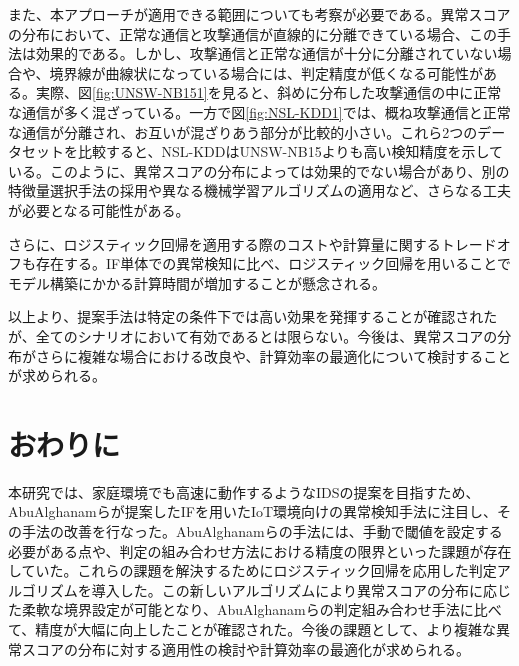 \documentclass{css}
\begin{document}
また、本アプローチが適用できる範囲についても考察が必要である。異常スコアの分布において、正常な通信と攻撃通信が直線的に分離できている場合、この手法は効果的である。しかし、攻撃通信と正常な通信が十分に分離されていない場合や、境界線が曲線状になっている場合には、判定精度が低くなる可能性がある。実際、図\ref{fig:UNSW-NB151}を見ると、斜めに分布した攻撃通信の中に正常な通信が多く混ざっている。一方で図\ref{fig:NSL-KDD1}では、概ね攻撃通信と正常な通信が分離され、お互いが混ざりあう部分が比較的小さい。これら2つのデータセットを比較すると、NSL-KDDはUNSW-NB15よりも高い検知精度を示している。このように、異常スコアの分布によっては効果的でない場合があり、別の特徴量選択手法の採用や異なる機械学習アルゴリズムの適用など、さらなる工夫が必要となる可能性がある。

さらに、ロジスティック回帰を適用する際のコストや計算量に関するトレードオフも存在する。IF単体での異常検知に比べ、ロジスティック回帰を用いることでモデル構築にかかる計算時間が増加することが懸念される。

以上より、提案手法は特定の条件下では高い効果を発揮することが確認されたが、全てのシナリオにおいて有効であるとは限らない。今後は、異常スコアの分布がさらに複雑な場合における改良や、計算効率の最適化について検討することが求められる。

\section{おわりに}
本研究では、家庭環境でも高速に動作するようなIDSの提案を目指すため、AbuAlghanamらが提案したIFを用いたIoT環境向けの異常検知手法\cite{AbuAlghanam2023-sx}に注目し、その手法の改善を行なった。AbuAlghanamらの手法には、手動で閾値を設定する必要がある点や、判定の組み合わせ方法における精度の限界といった課題が存在していた。これらの課題を解決するためにロジスティック回帰を応用した判定アルゴリズムを導入した。この新しいアルゴリズムにより異常スコアの分布に応じた柔軟な境界設定が可能となり、AbuAlghanamらの判定組み合わせ手法に比べて、精度が大幅に向上したことが確認された。今後の課題として、より複雑な異常スコアの分布に対する適用性の検討や計算効率の最適化が求められる。


\end{document}
